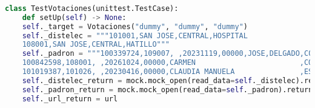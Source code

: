 \documentclass[conference]{IEEEtran}
\begin{document}
\begin{lstlisting}[language=Python, basicstyle=\tiny, breaklines=true,
    postbreak=\mbox{\textcolor{red}{$\hookrightarrow$}\space}]
    
class TestVotaciones(unittest.TestCase):
    def setUp(self) -> None:
	self._target = Votaciones("dummy", "dummy", "dummy")
	self._distelec = """101001,SAN JOSE,CENTRAL,HOSPITAL                                                          
	108001,SAN JOSE,CENTRAL,HATILLO"""
	self._padron = """100339724,109007, ,20231119,00000,JOSE,DELGADO,CORRALES         
	100842598,108001, ,20261024,00000,CARMEN                        ,CORRALES                  ,MORALES           
	101019387,101026, ,20230416,00000,CLAUDIA MANUELA               ,ESPINOZA                  ,FONSECA"""
	self._distelec_return = mock.mock_open(read_data=self._distelec).return_value
	self._padron_return = mock.mock_open(read_data=self._padron).return_value
	self._url_return = url


\end{lstlisting}
\end{document}
